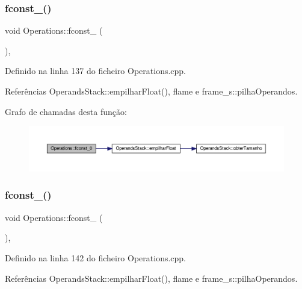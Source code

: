 \subsubsection{\texorpdfstring{fconst\+\_()}{fconst\_0()}}
{\footnotesize\ttfamily void Operations\+::fconst\+\_ (\begin{DoxyParamCaption}{ }\end{DoxyParamCaption})\hspace{0.3cm}{\ttfamily [static]}, {\ttfamily [private]}}



Definido na linha 137 do ficheiro Operations.\+cpp.



Referências Operands\+Stack\+::empilhar\+Float(), flame e frame\+\_\+s\+::pilha\+Operandos.

Grafo de chamadas desta função\+:
\nopagebreak
\begin{figure}[H]
\begin{center}
\leavevmode
\includegraphics[width=350pt]{classOperations_ad3d2d82d63e7a96e144cdf014d6fb1d9_cgraph}
\end{center}
\end{figure}
\mbox{\label{classOperations_aa2053d7f3d410a4531f5bd560b4211b4}} 
\subsubsection{\texorpdfstring{fconst\+\_()}{fconst\_1()}}
{\footnotesize\ttfamily void Operations\+::fconst\+\_ (\begin{DoxyParamCaption}{ }\end{DoxyParamCaption})\hspace{0.3cm}{\ttfamily [static]}, {\ttfamily [private]}}



Definido na linha 142 do ficheiro Operations.\+cpp.



Referências Operands\+Stack\+::empilhar\+Float(), flame e frame\+\_\+s\+::pilha\+Operandos.


